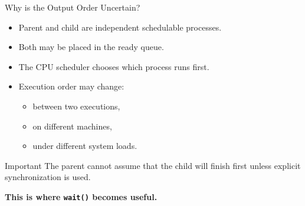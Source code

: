\documentclass[aspectratio=169]{beamer}
\begin{document}
\begin{frame}{Why is the Output Order Uncertain?}

\begin{itemize}

    \item Parent and child are independent schedulable processes.

    \item Both may be placed in the ready queue.

    \item The CPU scheduler chooses which process runs first.

    \item Execution order may change:
    \begin{itemize}
        \item between two executions,
        \item on different machines,
        \item under different system loads.
    \end{itemize}

\end{itemize}

\begin{alertblock}{Important}
The parent cannot assume that the child will finish first unless explicit
synchronization is used.
\end{alertblock}

\begin{center}
\Large
\textbf{This is where \texttt{wait()} becomes useful.}
\end{center}

\end{frame}
\end{document}
